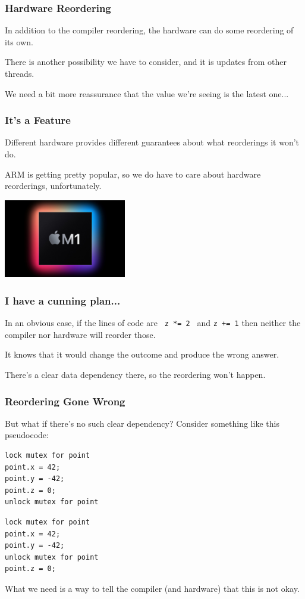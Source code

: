\begin{frame}
\frametitle{Hardware Reordering}

In addition to the compiler reordering, the hardware can do some reordering of its own.

There is another possibility we have to consider, and it is updates from other threads.

We need a bit more reassurance that the value we're seeing is the latest one...

\end{frame}


\begin{frame}
\frametitle{It's a Feature}

Different hardware provides different guarantees about what reorderings it won't do.

 ARM is getting pretty popular, so we do have to care about hardware reorderings, unfortunately.
 
 \begin{center}
	\includegraphics[width=0.4\textwidth]{images/apple-m1.jpg}
\end{center}

\end{frame}


\begin{frame}
\frametitle{I have a cunning plan...}

In an obvious case, if the lines of code are \texttt{ z *= 2 } and \texttt {z += 1} then neither the compiler nor hardware will reorder those.

It knows that it would change the outcome and produce the wrong answer. 

There's a clear data dependency there, so the reordering won't happen. 


\end{frame}


\begin{frame}[fragile]
\frametitle{Reordering Gone Wrong}

But what if there's no such clear dependency? Consider something like this pseudocode:

\begin{multicols}{2}
\begin{verbatim}
lock mutex for point
point.x = 42;
point.y = -42;
point.z = 0;
unlock mutex for point
\end{verbatim}
\columnbreak
\begin{verbatim}
lock mutex for point
point.x = 42;
point.y = -42;
unlock mutex for point
point.z = 0;
\end{verbatim}
\end{multicols}

What we need is a way to tell the compiler (and hardware) that this is not okay.


\end{frame}


